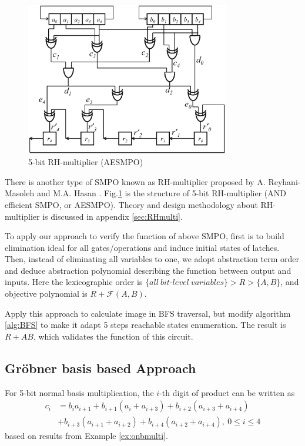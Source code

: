 \begin{figure}[hbt]
\begin{center}
\includegraphics[width=3.5in]{./RH.eps}

\end{center}
\caption{5-bit RH-multiplier (AESMPO)}
\label{fig:RHmulti}
\end{figure}

There is another type of SMPO known as RH-multiplier proposed by A. Reyhani-Masoleh and M.A. Hasan
\cite{RHmulti}. Fig.\ref{fig:RHmulti} is the structure of 5-bit RH-multiplier (AND efficient SMPO, or AESMPO).
Theory and design methodology about RH-multiplier is discussed in appendix \ref{sec:RHmulti}.

To apply our approach to verify the function of above SMPO, first is to build elimination ideal for 
all gates/operations and induce initial states of latches. Then, instead of eliminating all variables
to one, we adopt abstraction term order and deduce abstraction polynomial describing the function 
between output and inputs.
Here the lexicographic order is $\{all\ bit$-$level\ variables\} > R > \{A, B\}$, and objective
polynomial is $R + \mathcal{F}(A, B)$.

Apply this approach to calculate image in BFS traversal, but modify algorithm
\ref{alg:BFS} to make it adapt 5 steps reachable states enumeration.
The result is $R + AB$, which validates the function of this circuit.


\subsection{Gr\"obner basis based Approach}
\label{sec:SMPOexperiment}

For 5-bit normal basis multiplication, the $i$-th digit of product can be written as
\begin{align}
c_i &= b_ia_{i+1} + b_{i+1}(a_i + a_{i+3}) + b_{i+2}(a_{i+3} + a_{i+4}) \nonumber\\
&+ b_{i+3}(a_{i+1} + a_{i+2}) + b_{i+4}
(a_{i+2} + a_{i+4}),\ 0\leq i\leq 4 \nonumber
\end{align}
based on results from Example \ref{ex:onbmulti}.

